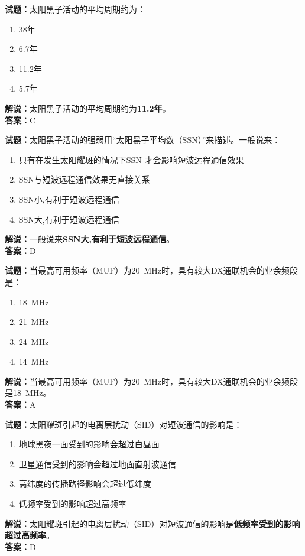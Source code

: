 \documentclass{ctexbook}
\begin{document}
\vspace{1em}

\textbf{试题：}太阳黑子活动的平均周期约为：
\begin{enumerate}[leftmargin=3em]
  \item 38年
  \item 6.7年
  \item 11.2年
  \item 5.7年
\end{enumerate}
\noindent\textbf{解说：}太阳黑子活动的平均周期约为\textbf{11.2年}。\\
\noindent\textbf{答案：}C

\vspace{1em}

\textbf{试题：}太阳黑子活动的强弱用“太阳黑子平均数（SSN）”来描述。一般说来：
\begin{enumerate}[leftmargin=3em]
  \item 只有在发生太阳耀斑的情况下SSN 才会影响短波远程通信效果
  \item SSN与短波远程通信效果无直接关系
  \item SSN小,有利于短波远程通信
  \item SSN大,有利于短波远程通信
\end{enumerate}
\noindent\textbf{解说：}一般说来\textbf{SSN大,有利于短波远程通信}。\\\noindent\textbf{答案：}D

\vspace{1em}

\textbf{试题：}当最高可用频率（MUF）为\SI{20}{\MHz}时，具有较大DX通联机会的业余频段是：
\begin{enumerate}[leftmargin=3em]
  \item \SI{18}{\MHz}
  \item \SI{21}{\MHz}
  \item \SI{24}{\MHz}
  \item \SI{14}{\MHz}
\end{enumerate}
\noindent\textbf{解说：}当最高可用频率（MUF）为\SI{20}{\MHz}时，具有较大DX通联机会的业余频段是\SI{18}{\MHz}。\\
\noindent\textbf{答案：}A

\vspace{1em}

\textbf{试题：}太阳耀斑引起的电离层扰动（SID）对短波通信的影响是：
\begin{enumerate}[leftmargin=3em]
  \item 地球黑夜一面受到的影响会超过白昼面
  \item 卫星通信受到的影响会超过地面直射波通信
  \item 高纬度的传播路径影响会超过低纬度
  \item 低频率受到的影响超过高频率
\end{enumerate}
\noindent\textbf{解说：}太阳耀斑引起的电离层扰动（SID）对短波通信的影响是\textbf{低频率受到的影响超过高频率}。\\\noindent\textbf{答案：}D
\end{document}
